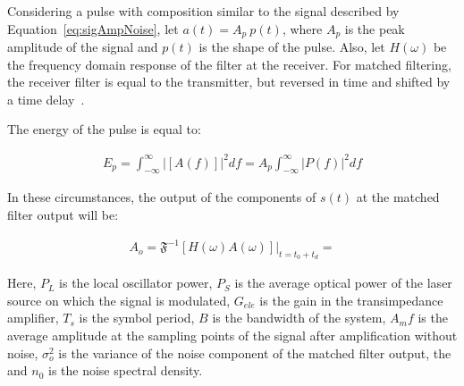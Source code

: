Considering a pulse with composition similar to the signal described by Equation~\ref{eq:sigAmpNoise}, let $ a(t) = A_p~p(t) $, where $A_p$ is the peak amplitude of the signal and $p(t)$ is the shape of the pulse. Also, let $H(\omega)$ be the frequency domain response of the filter at the receiver. For matched filtering, the receiver filter is equal to the transmitter, but reversed in time and shifted by a time delay~\cite{carlson1986communication}.

The energy of the pulse is equal to:

\begin{eqnarray}
E_p = \int_{-\infty}^{\infty} {|[A(f)]|}^2 df = A_p \int_{-\infty}^{\infty} {|P(f)|}^2 df  
\end{eqnarray}


In these circumstances, the output of the components of $s(t)$ at the matched filter output will be:

\begin{eqnarray}
A_o = \mathfrak{F}^{-1}\left[H(\omega) A(\omega)\right]\big|_{t=t_0+t_d} = 
\end{eqnarray}



Here, $P_L$ is the local oscillator power, $P_S$ is the average optical power of the laser source on which the signal is modulated, $G_{ele}$ is the gain in the transimpedance amplifier, $T_s$ is the symbol period, $B$ is the bandwidth of the system, $A_mf$ is the average amplitude at the sampling points of the signal after amplification without noise, $\sigma_o^2$ is the variance of the noise component of the matched filter output, the and $n_0$ is the noise spectral density.


